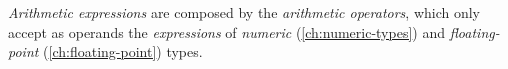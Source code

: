 \emph{Arithmetic expressions} are composed by
the \emph{arithmetic operators},
which only accept as operands
the \emph{expressions} of \emph{numeric} (\ref{ch:numeric-types})
and \emph{floating-point} (\ref{ch:floating-point}) types.
